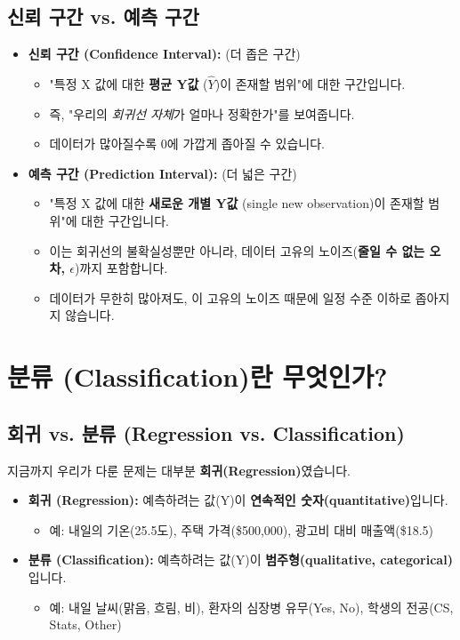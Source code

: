 \documentclass[11pt,a4paper]{book}
\theoremstyle{definition}
\begin{document}
\subsection{신뢰 구간 vs. 예측 구간}

\begin{itemize}
    \item \textbf{신뢰 구간 (Confidence Interval):} (더 좁은 구간)
    \begin{itemize}
        \item "특정 X 값에 대한 \textbf{평균 Y값} ($\hat{Y}$)이 존재할 범위"에 대한 구간입니다.
        \item 즉, "우리의 \textit{회귀선 자체}가 얼마나 정확한가"를 보여줍니다.
        \item 데이터가 많아질수록 0에 가깝게 좁아질 수 있습니다.
    \end{itemize}
    \item \textbf{예측 구간 (Prediction Interval):} (더 넓은 구간)
    \begin{itemize}
        \item "특정 X 값에 대한 \textbf{새로운 개별 Y값} (single new observation)이 존재할 범위"에 대한 구간입니다.
        \item 이는 회귀선의 불확실성뿐만 아니라, 데이터 고유의 노이즈(\textbf{줄일 수 없는 오차, $\epsilon$})까지 포함합니다.
        \item 데이터가 무한히 많아져도, 이 고유의 노이즈 때문에 일정 수준 이하로 좁아지지 않습니다.
    \end{itemize}
\end{itemize}


\section{분류 (Classification)란 무엇인가?}

\subsection{회귀 vs. 분류 (Regression vs. Classification)}

지금까지 우리가 다룬 문제는 대부분 \textbf{회귀(Regression)}였습니다.

\begin{itemize}
    \item \textbf{회귀 (Regression):} 예측하려는 값(Y)이 \textbf{연속적인 숫자(quantitative)}입니다.
    \begin{itemize}
        \item 예: 내일의 기온(25.5도), 주택 가격(\$500,000), 광고비 대비 매출액(\$18.5)
    \end{itemize}
    \item \textbf{분류 (Classification):} 예측하려는 값(Y)이 \textbf{범주형(qualitative, categorical)}입니다.
    \begin{itemize}
        \item 예: 내일 날씨(맑음, 흐림, 비), 환자의 심장병 유무(Yes, No), 학생의 전공(CS, Stats, Other)
    \end{itemize}
\end{itemize}
\end{document}

